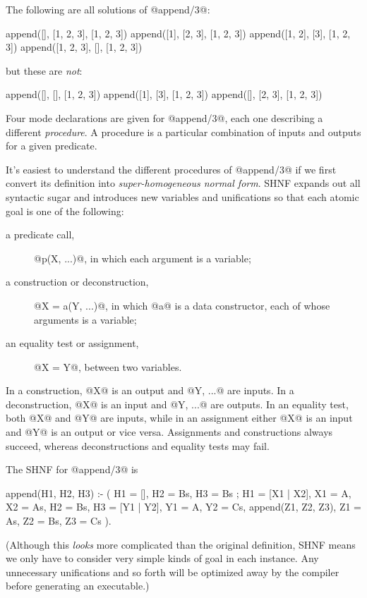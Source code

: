 The following are all solutions of @append/3@:
\begin{myverbatim}
    append([], [1, 2, 3], [1, 2, 3])
    append([1],   [2, 3], [1, 2, 3])
    append([1, 2],   [3], [1, 2, 3])
    append([1, 2, 3], [], [1, 2, 3])
\end{myverbatim}
but these are \emph{not}:
\begin{myverbatim}
    append([],     [], [1, 2, 3])
    append([1],   [3], [1, 2, 3])
    append([], [2, 3], [1, 2, 3])
\end{myverbatim}

Four mode declarations are given for @append/3@, each one describing a
different \emph{procedure}.  A procedure is a particular combination
of inputs and outputs for a given predicate.

It's easiest to understand the different procedures of @append/3@ if we
first convert its definition into \emph{super-homogeneous normal form}.
SHNF expands out all syntactic sugar and introduces new variables and
unifications so that each atomic goal is one of the following:
\begin{description}
\item [a predicate call,] @p(X, ...)@, in which each argument is a
variable;
\item [a construction or deconstruction,] @X = a(Y, ...)@, in which @a@
is a data constructor, each of whose arguments is a variable;
\item [an equality test or assignment,] @X = Y@, between two variables.
\end{description}
In a construction, @X@ is an output and @Y, ...@ are inputs.  In a
deconstruction, @X@ is an input and @Y, ...@ are outputs.  In an
equality test, both @X@ and @Y@ are inputs, while in an assignment
either @X@ is an input and @Y@ is an output or vice versa.  Assignments
and constructions always succeed, whereas deconstructions and equality
tests may fail.

The SHNF for @append/3@ is
\begin{myverbatim}
append(H1, H2, H3) :-
    (
        H1 = [],
        H2 = Bs,
        H3 = Bs
    ;
        H1 = [X1 | X2],  X1 = A,  X2 = As,
        H2 = Bs,
        H3 = [Y1 | Y2],  Y1 = A,  Y2 = Cs,
        append(Z1, Z2, Z3),  Z1 = As,  Z2 = Bs,  Z3 = Cs
    ).
\end{myverbatim}
(Although this \emph{looks} more complicated than the original
definition, SHNF means we only have to consider very simple kinds of
goal in each instance.  Any unnecessary unifications and so forth will
be optimized away by the compiler before generating an executable.)

